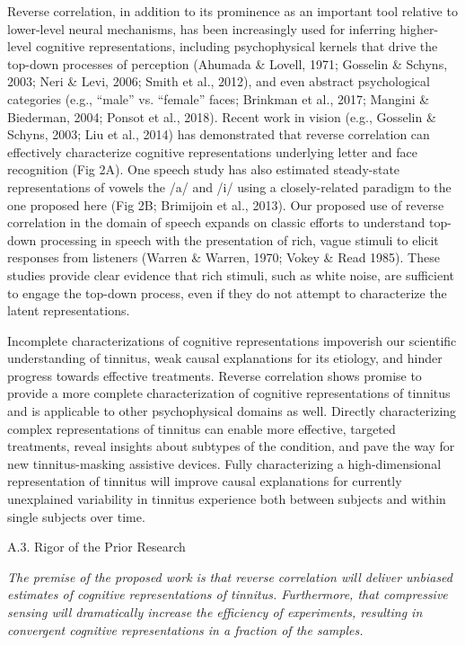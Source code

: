 \documentclass[11pt, notitlepage]{article} %
\begin{document}
Reverse correlation, in addition to its prominence as an important tool relative to lower-level
neural mechanisms, has been increasingly used for inferring higher-level cognitive representations,
including psychophysical kernels that drive the top-down processes of perception (Ahumada \& Lovell,
1971; Gosselin \& Schyns, 2003; Neri \& Levi, 2006; Smith et al., 2012), and even abstract psychological
categories (e.g., “male” vs. “female” faces; Brinkman et al., 2017; Mangini \& Biederman, 2004; Ponsot et
al., 2018). Recent work in vision (e.g., Gosselin \& Schyns, 2003; Liu et al., 2014) has demonstrated that
reverse correlation can effectively characterize cognitive representations underlying letter and face
recognition (Fig 2A). One speech study has also estimated steady-state representations of vowels the /a/
and /i/ using a closely-related paradigm to the one proposed here (Fig 2B; Brimijoin et al., 2013). Our
proposed use of reverse correlation in the domain of speech expands on classic efforts to understand
top-down processing in speech with the presentation of rich, vague stimuli to elicit responses from
listeners (Warren \& Warren, 1970; Vokey \& Read 1985). These studies provide clear evidence that rich
stimuli, such as white noise, are sufficient to engage the top-down process, even if they do not attempt to
characterize the latent representations.

Incomplete characterizations of cognitive representations impoverish our scientific understanding of tinnitus,
weak causal explanations for its etiology, and hinder progress towards effective treatments.
Reverse correlation shows promise to provide a more complete characterization of cognitive representations of tinnitus
and is applicable to other psychophysical domains as well.
Directly characterizing complex representations of tinnitus can enable more effective, targeted treatments,
reveal insights about subtypes of the condition, and pave the way for new tinnitus-masking assistive devices.
Fully characterizing a high-dimensional representation of tinnitus will improve causal explanations
for currently unexplained variability in tinnitus experience both between subjects and within single subjects over time.

\begin{description}
	\item[A.3. Rigor of the Prior Research]{}
\end{description}

\emph{The premise of the proposed work is that reverse correlation will deliver unbiased estimates
of cognitive representations of tinnitus. Furthermore, that compressive sensing will dramatically
increase the efficiency of experiments, resulting in convergent cognitive representations
in a fraction of the samples.}
\end{document}
